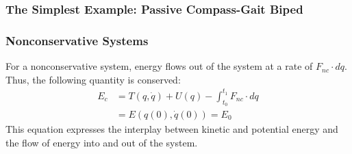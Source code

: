 \documentclass{beamer}
\newcommand{\nc}{\mathit{nc}}
\begin{document}
\begin{frame}
  \frametitle{The Simplest Example: Passive Compass-Gait Biped}
\end{frame}

\begin{frame}
  \frametitle{Nonconservative Systems}
  For a nonconservative system, energy flows out of the system at a rate of $F_{\nc} \cdot dq$. Thus, the following quantity is conserved:
  \begin{align*}
    E_{c} &= T(q, \dot q) + U(q) - \int_{t_{0}}^{t_{1}} \! F_{\nc} \cdot dq\\
    &= E(q(0), \dot q(0)) = E_{0}
  \end{align*}
  This equation expresses the interplay between kinetic and potential energy and the flow of energy into and out of the system.
\end{frame}
\end{document}
